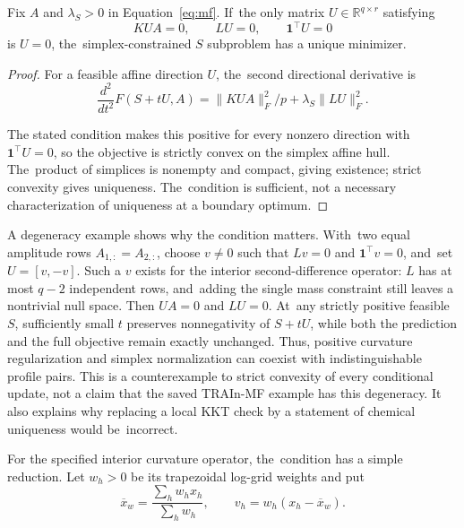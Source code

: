 \documentclass[mathematics,article,accept,moreauthors]{Definitions/mdpi}
\newcommand{\R}{\mathbb{R}}
\newcommand{\one}{\mathbf{1}}
\begin{document}
\begin{Proposition}\label{prop:mfprofile}
Fix $A$ and $\lambda_S>0$ in Equation~\eqref{eq:mf}. If~the only matrix $U\in\R^{q\times r}$ satisfying
\begin{equation}\label{eq:mfprofileunique}
 KUA=0,\qquad LU=0,\qquad\one^\top U=0
\end{equation}
is $U=0$, the~simplex-constrained $S$ subproblem has a unique minimizer.
\end{Proposition}
\begin{proof}
For a feasible affine direction $U$, the~second directional derivative is
\begin{equation}\label{eq:mfsecondvariation}
 \frac{d^2}{dt^2}F(S+tU,A)=\|KUA\|_F^2/p+\lambda_S\|LU\|_F^2.
\end{equation}

The stated condition makes this positive for every nonzero direction with $\one^\top U=0$, so the objective is strictly convex on the simplex affine hull. The~product of simplices is nonempty and compact, giving existence; strict convexity gives uniqueness. The~condition is sufficient, not a necessary characterization of uniqueness at a boundary optimum.
\end{proof}

A degeneracy example shows why the condition matters. With~two equal amplitude rows $A_{1,:}=A_{2,:}$, choose $v\ne0$ such that $Lv=0$ and $\one^\top v=0$, and~set $U=[v,-v]$. Such a $v$ exists for the interior second-difference operator: $L$ has at most $q-2$ independent rows, and~adding the single mass constraint still leaves a nontrivial null space. Then $UA=0$ and $LU=0$. At~any strictly positive feasible $S$, sufficiently small $t$ preserves nonnegativity of $S+tU$, while both the prediction and the full objective remain exactly unchanged. Thus, positive curvature regularization and simplex normalization can coexist with indistinguishable profile pairs. This is a counterexample to strict convexity of every conditional update, not a claim that the saved TRAIn-MF example has this degeneracy. It also explains why replacing a local KKT check by a statement of chemical uniqueness would be~incorrect.

For the specified interior curvature operator, the~condition has a simple reduction. Let $w_h>0$ be its trapezoidal log-grid weights and put
\[
 \overline x_w=\frac{\sum_h w_hx_h}{\sum_h w_h},\qquad
 v_h=w_h(x_h-\overline x_w).
\]
\end{document}
